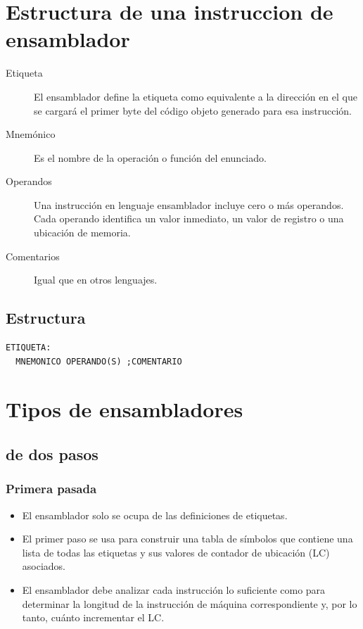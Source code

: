 \documentclass[11pt]{article}
\begin{document}
\section{Estructura de una instruccion de ensamblador}
\label{sec:org04322f6}
\begin{description}
\item[{Etiqueta}] El ensamblador define la etiqueta como equivalente a la dirección en el que se cargará el primer byte del código objeto generado para esa instrucción.

\item[{Mnemónico}] Es el nombre de la operación o función del enunciado.

\item[{Operandos}] Una instrucción en lenguaje ensamblador incluye cero o más operandos. Cada operando identifica un valor inmediato, un valor de registro o una ubicación de memoria.

\item[{Comentarios}] Igual que en otros lenguajes.
\end{description}

\subsection{Estructura}
\label{sec:org9a0c1dd}
\begin{verbatim}
ETIQUETA:
  MNEMONICO OPERANDO(S) ;COMENTARIO
\end{verbatim}

\section{Tipos de ensambladores}
\label{sec:org06a955d}
\subsection{de dos pasos}
\label{sec:org65b552b}
\subsubsection*{Primera pasada}
\label{sec:orga4384f9}
\begin{itemize}
\item El ensamblador solo se ocupa de las definiciones de etiquetas.

\item El primer paso se usa para construir una tabla de símbolos que contiene una lista de todas las etiquetas y sus valores de contador de ubicación (LC) asociados.

\item El ensamblador debe analizar cada instrucción lo suficiente como para determinar la longitud de la instrucción de máquina correspondiente y, por lo tanto, cuánto incrementar el LC.
\end{itemize}
\end{document}
